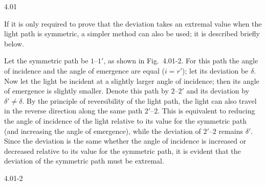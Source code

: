 \begin{solution}{4.01}
\begin{commentary}
If it is only required to prove that the deviation takes an extremal value when the light path is
symmetric, a simpler method can also be used; it is described briefly below.

Let the symmetric path be $1$--$1'$, as shown in Fig.~4.01-2. For this path the angle of
incidence and the angle of emergence are equal ($i=r'$); let its deviation be $\delta$. Now let
the light be incident at a slightly larger angle of incidence; then its angle of emergence is
slightly smaller. Denote this path by $2$--$2'$ and its deviation by $\delta'\neq\delta$. By the
principle of reversibility of the light path, the light can also travel in the reverse direction
along the same path $2'$--$2$. This is equivalent to reducing the angle of incidence of the light
relative to its value for the symmetric path (and increasing the angle of emergence), while the
deviation of $2'$--$2$ remains $\delta'$. Since the deviation is the same whether the angle of
incidence is increased or decreased relative to its value for the symmetric path, it is evident
that the deviation of the symmetric path must be extremal.

\begin{figbox}{4.01-2}
\end{figbox}
\end{commentary}
\end{solution}

